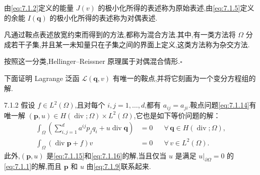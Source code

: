 \begin{note}
由\eqref{eq:7.1.2}定义的能量 \(J(v)\) 的极小化所得的表述称为{\heiti 原始表述},由\eqref{eq:7.1.5}定义的余能 \(I(\boldsymbol{q})\) 的极小化所得的表述称为{\heiti 对偶表述}.

凡通过鞍点表述放宽约束而得到的方法,都称为{\heiti 混合方法}.其中,有一类方法将 \(\Omega\) 分成若干子集,并且某一未知量只在子集之间的界面上定义,这类方法称为{\heiti 杂交方法}.

按照这一分类,Hellinger--Reissner 原理属于{\heiti 对偶混合}情形.\hfill\(\square\)
\end{note}

下面证明 Lagrange 泛函 \(\mathcal L(\boldsymbol{q},v)\) 有唯一的鞍点,并将它刻画为一个变分方程组的解.

\begin{theorem}[]{7.1.2}
假设 \(f\in L^2(\Omega)\),且对每个 \(i,j=1,\ldots,d\),都有 \(a_{ij}=a_{ji}\).鞍点问题\eqref{eq:7.1.14}有唯一解 \((\boldsymbol{p},u)\in H(\operatorname{div};\Omega)\times L^2(\Omega)\),它也是如下等价问题的解：
\begin{align}
  \int_\Omega\left(\sum_{i,j=1}^d a^{ij}p_jq_i+u\operatorname{div}\boldsymbol{q}\right)
    &=0 &&\forall\,\boldsymbol{q}\in H(\operatorname{div};\Omega),\label{eq:7.1.15}\\
  \int_\Omega(\operatorname{div}\boldsymbol{p}+f)v
    &=0 &&\forall\,v\in L^2(\Omega).\label{eq:7.1.16}
\end{align}
此外,\((\boldsymbol{p},u)\) 是\eqref{eq:7.1.15}和\eqref{eq:7.1.16}的解,当且仅当 \(u\) 是满足 \(u|_{\partial\Omega}=0\) 的\eqref{eq:7.1.1}的解,而且 \(\boldsymbol{p}\) 和 \(u\) 由\eqref{eq:7.1.9}联系起来.
\end{theorem}

